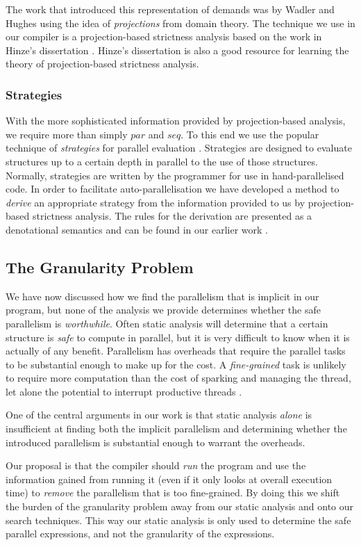 The work that introduced this representation of demands was by Wadler and
Hughes \citep{wadler1987projections} using the idea of \emph{projections} from
domain theory.  The technique we use in our compiler is a projection-based
strictness analysis based on the work in Hinze's dissertation
\citep{hinze1995projection}.  Hinze's dissertation is also a good resource for
learning the theory of projection-based strictness analysis.

\subsubsection*{Strategies}

With the more sophisticated information provided by projection-based analysis,
we require more than simply $par$ and $seq$. To this end we use the popular
technique of \emph{strategies} for parallel evaluation \citep{strategies,
marlow2010seq}. Strategies are designed to evaluate structures up to a certain
depth in parallel to the use of those structures. Normally, strategies are
written by the programmer for use in hand-parallelised code. In order to
facilitate auto-parallelisation we have developed a method to \emph{derive} an
appropriate strategy from the information provided to us by projection-based
strictness analysis. The rules for the derivation are presented as a
denotational semantics and can be found in our earlier work \citep{calderon}.

\subsection{The Granularity Problem}

We have now discussed how we find the parallelism that is implicit in our
program, but none of the analysis we provide determines whether the safe
parallelism is \emph{worthwhile}. Often static analysis will determine that a
certain structure is \emph{safe} to compute in parallel, but it is very
difficult to know when it is actually of any benefit. Parallelism has overheads
that require the parallel tasks to be substantial enough to make up for the
cost. A \emph{fine-grained} task is unlikely to require more computation than
the cost of sparking and managing the thread, let alone the potential to
interrupt productive threads \citep{hammond2000research, hogen1992automatic}.

One of the central arguments in our work is that static analysis \emph{alone}
is insufficient at finding both the implicit parallelism and determining whether
the introduced parallelism is substantial enough to warrant the overheads.

Our proposal is that the compiler should \emph{run} the program and use the
information gained from running it (even if it only looks at overall execution
time) to \emph{remove} the parallelism that is too fine-grained. By doing this
we shift the burden of the granularity problem away from our static analysis
and onto our search techniques. This way our static analysis is only used to
determine the safe parallel expressions, and not the granularity of the
expressions.

